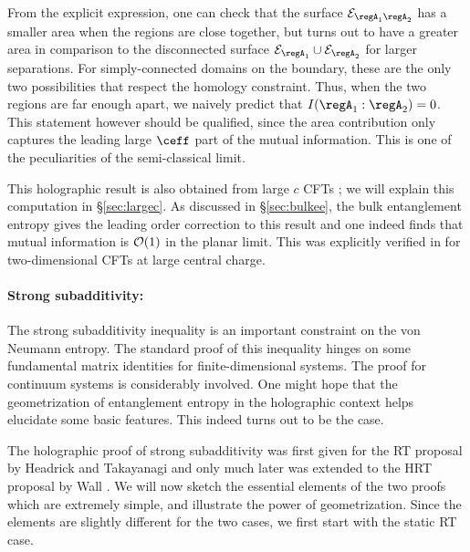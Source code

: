 \documentclass[12pt,openany]{book}
\begin{document}
From the explicit expression, one can check that the surface ${\cal E}_{\regA_1 \regA_2}$ has a smaller area when the regions are close together, but turns out to have a greater area in comparison to the disconnected surface ${\cal E}_{\regA_1} \cup {\cal E}_{\regA_2}$ for larger separations. For simply-connected domains on the boundary, these are the only two possibilities that respect the homology constraint. Thus, when the two regions are far enough apart, we naively predict that $I(\regA_1:\regA_2) =0$. This statement however should be qualified, since the area contribution only captures the leading large $\ceff$ part of the mutual information.  This is one of the peculiarities of the semi-classical limit.

This holographic result is also obtained from large $c$ CFTs \cite{Hartman:2013mia}; we will explain this computation in \S\ref{sec:largec}. As discussed in \S\ref{sec:bulkee}, the bulk entanglement entropy gives the leading order correction to this result and one indeed finds that mutual information is ${\cal O}(1)$ in the planar limit. This was explicitly verified in \cite{Barrella:2013wja} for two-dimensional CFTs at large central charge.


\paragraph{Strong subadditivity:} The strong subadditivity inequality is an important constraint on the von Neumann entropy. The standard proof of this inequality \cite{Lieb:1973cp} hinges on some fundamental matrix identities for finite-dimensional systems. The proof for continuum systems is considerably involved. One might hope that the geometrization of entanglement entropy in the holographic context helps elucidate some basic features. This indeed turns out to be the case.

The holographic proof of strong subadditivity was first given for the RT proposal by Headrick and Takayanagi \cite{Headrick:2007km} and only much later was extended to the HRT proposal by Wall \cite{Wall:2012uf}. We will now sketch the essential elements of the two proofs which are extremely simple, and illustrate the power of geometrization. Since the elements are slightly different for the two cases, we first start with the static RT case.
\end{document}
